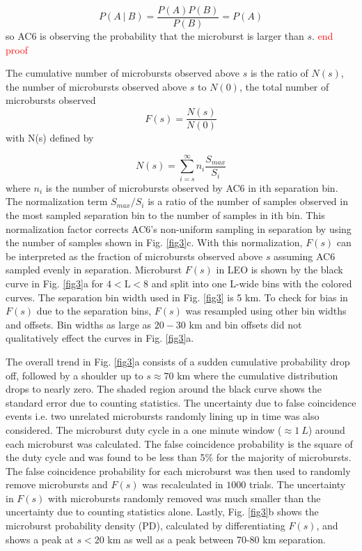 \documentclass[draft]{agujournal2019}
\begin{document}
\begin{equation}
P(A \ \vert \ B) = \frac{P(A)P(B)}{P(B)} = P(A)
\end{equation} so AC6 is observing the probability that the microburst is larger than $s$. \textcolor{red}{end proof} 
\fi

The cumulative number of microbursts observed above $s$ is the ratio of $N(s)$, the number of microbursts observed above $s$ to $N(0)$, the total number of microbursts observed 
\begin{equation}
F(s) = \frac{N(s)}{N(0)}
\end{equation} with N(s) defined by

\begin{equation}
N(s) = \sum_{i = s}^\infty n_{i} \frac{S_{max}}{S_{i}}
\end{equation} where $n_{i}$ is the number of microbursts observed by AC6 in ith separation bin. The normalization term $S_{max}/S_{i}$ is a ratio of the number of samples observed in the most sampled separation bin to the number of samples in ith bin. This normalization factor corrects AC6's non-uniform sampling in separation by using the number of samples shown in Fig. \ref{fig3}c. With this normalization, $F(s)$ can be interpreted as the fraction of microbursts observed above $s$ assuming AC6 sampled evenly in separation. Microburst $F(s)$ in LEO is shown by the black curve in Fig. \ref{fig3}a for $4 < \mathrm{L}< 8$ and split into one L-wide bins with the colored curves. The separation bin width used in Fig. \ref{fig3} is 5 km. To check for bias in $F(s)$ due to the separation bins, $F(s)$ was resampled using other bin widths and offsets. Bin widths as large as $20-30$ km and bin offsets did not qualitatively effect the curves in Fig. \ref{fig3}a.

The overall trend in Fig. \ref{fig3}a consists of a sudden cumulative probability drop off, followed by a shoulder up to $s \approx 70$ km where the cumulative distribution drops to nearly zero. The shaded region around the black curve shows the standard error due to counting statistics. The uncertainty due to false coincidence events i.e. two unrelated microbursts randomly lining up in time was also considered. The microburst duty cycle in a one minute window ($\approx 1 \ L$) around each microburst was calculated. The false coincidence probability is the square of the duty cycle and was found to be less than 5\% for the majority of microbursts. The false coincidence probability for each microburst was then used to randomly remove microbursts and $F(s)$ was recalculated in $1000$ trials. The uncertainty in $F(s)$ with microbursts randomly removed was much smaller than the uncertainty due to counting statistics alone. Lastly, Fig. \ref{fig3}b shows the microburst probability density (PD), calculated by differentiating $F(s)$, and shows a peak at $s < 20 $ km as well as a peak between 70-80 km separation. 
\end{document}
